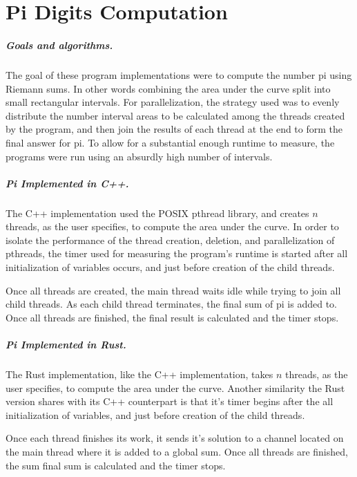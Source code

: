 \chapter{Pi Digits Computation}
\paragraph{Goals and algorithms.}
The goal of these program implementations were to compute the number pi using
Riemann sums. In other words combining the area under the curve split into small
rectangular intervals. For
parallelization, the strategy used was to evenly distribute the
number interval areas to be calculated among the threads created by the
program, and then join the results of each thread at the end to form the final
answer for pi. To allow for a substantial enough runtime to measure, the
programs were run using an absurdly high number of intervals.

\paragraph{Pi Implemented in C++.}
The C++ implementation used the POSIX pthread library, and creates $n$
threads, as the user specifies, to compute the area under the curve. In order
to isolate the performance of the thread creation, deletion, and parallelization
of pthreads, the timer used for measuring the program's runtime is started after
all initialization of variables occurs, and just before creation of the child
threads.

Once all
threads are created, the main thread waits idle while trying to join all child
threads. As each child thread terminates, the final sum of pi is added to. Once
all threads are finished, the final result is calculated and the timer stops.

\paragraph{Pi Implemented in Rust.}
The Rust implementation, like the C++ implementation, takes $n$ threads, as the
user specifies, to compute the area under the curve. Another similarity the Rust
version shares with its C++ counterpart is that it's timer begins after the all
initialization of variables, and just before creation of the child threads.

Once each thread finishes its work, it sends it's solution to a channel located
on the main thread where it is added to a global sum. Once all threads are
finished, the sum final sum is calculated and the timer stops.

